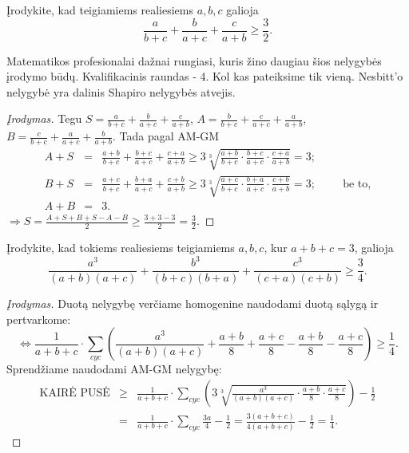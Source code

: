 \begin{pavnr}
  Įrodykite, kad teigiamiems realiesiems $a,b,c$ galioja
  $$\frac{a}{b+c}+\frac{b}{a+c}+\frac{c}{a+b}\geq\frac{3}{2}.$$
\end{pavnr}

\begin{pastaba} Matematikos profesionalai dažnai rungiasi, kuris žino
  daugiau šios nelygybės įrodymo būdų. Kvalifikacinis raundas - 4.
  Kol kas pateiksime tik vieną. Nesbitt'o nelygybė yra dalinis Shapiro
  nelygybės atvejis.
\end{pastaba}

\begin{proof}[Įrodymas]
  Tegu $S=\frac{a}{b+c}+\frac{b}{a+c}+\frac{c}{a+b}$,
  $A=\frac{b}{b+c}+\frac{c}{a+c}+\frac{a}{a+b}$,
  $B=\frac{c}{b+c}+\frac{a}{a+c}+\frac{b}{a+b}$.
  Tada pagal AM-GM
  \begin{eqnarray*}
    A+S&=&\frac{a+b}{b+c}+\frac{b+c}{a+c}+\frac{c+a}{a+b}\geq3\sqrt[3]{\frac{a+b}{b+c}\cdot\frac{b+c}{a+c}\cdot\frac{c+a}{a+b}}=3;\\
    B+S&=&\frac{a+c}{b+c}+\frac{b+a}{a+c}+\frac{c+b}{a+b}\geq3\sqrt[3]{\frac{a+c}{b+c}\cdot\frac{b+a}{a+c}\cdot\frac{c+b}{a+b}}=3; \hspace{1cm}\mbox{be
to,}\\
    A+B&=&3.
  \end{eqnarray*}
  $\Rightarrow S=\frac{A+S+B+S-A-B}{2}\geq\frac{3+3-3}{2}=\frac{3}{2}.$
\end{proof}

\begin{pavnr}
  Įrodykite, kad tokiems realiesiems teigiamiems $a,b,c$, kur $a+b+c=3$,
  galioja
  $$\frac{a^3}{(a+b)(a+c)}+\frac{b^3}{(b+c)(b+a)}+\frac{c^3}{(c+a)(c+b)}\geq\frac{3}{4}.$$
\end{pavnr}

\begin{proof}[Įrodymas]
  Duotą nelygybę verčiame homogenine naudodami duotą sąlygą ir pertvarkome:
  $$\Leftrightarrow
  \frac{1}{a+b+c}\cdot\sum_{cyc}{\left(\frac{a^3}{(a+b)(a+c)}+\frac{a+b}{8}+\frac{a+c}{8}-\frac{a+b}{8}-\frac{a+c}{8}\right)}\geq\frac{1}{4}.$$
  Sprendžiame naudodami AM-GM nelygybę:
  \begin{eqnarray*}
    \mbox{KAIRĖ
    PUSĖ}&\geq&\frac{1}{a+b+c}\cdot\sum_{cyc}{\left(3\sqrt[3]{\frac{a^3}{(a+b)(a+c)}\cdot\frac{a+b}{8}\cdot\frac{a+c}{8}}\right)}-\frac{1}{2}\\
    &=&\frac{1}{a+b+c}\cdot\sum_{cyc}{\frac{3a}{4}}-\frac{1}{2}=\frac{3(a+b+c)}{4(a+b+c)}
    - \frac{1}{2}=\frac{1}{4}.
  \end{eqnarray*}
\end{proof}

